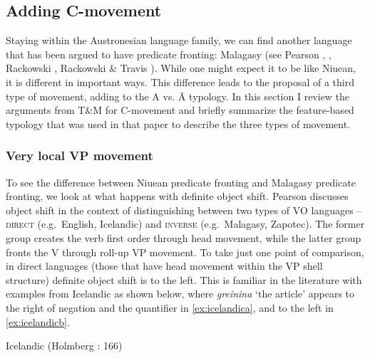 \documentclass[output=paper,colorlinks,citecolor=brown,
]{langscibook}
\begin{document}
\subsection{Adding C-movement}

Staying within the Austronesian language family, we can find another language that has been argued to have predicate fronting: Malagasy (see Pearson \citeyear{Pearson:1997}, \citeyear{Pearson:2018}, Rackowski \citeyear{Rackowski:1998}, Rackowski \& Travis \citeyear{Rackowski:2000}).  While one might expect it to be  like Niuean, it is different in important ways.  This difference leads to the proposal of a third type of movement, adding to the A vs. \=A typology.  In this section I review the arguments from T\&M for C-movement and briefly summarize the feature-based typology that was used in that paper to describe the three types of movement.


\subsubsection{Very local VP movement}

To see the difference between Niuean predicate fronting and Malagasy predicate fronting, we look at what happens with definite object shift.  Pearson \citeyearpar{Pearson:2000} discusses object shift in the context of distinguishing between two types of VO languages -- \textsc{direct} (e.g.\ English, Icelandic) and \textsc{inverse} (e.g.\ Malagasy, Zapotec).  The former group creates the verb first order through head movement, while the latter group fronts the V through roll-up VP movement.  To take just one point of comparison, in direct languages (those that have head movement within the VP shell structure) definite object shift is to the left.  This is familiar in the literature with examples from Icelandic as shown below, where \textit{greinina} `the article' appears to the right of negation and the quantifier in \ref{ex:icelandica}, and to the left in \ref{ex:icelandicb}.  

\ea Icelandic (Holmberg \citeyear{Holmberg:1986}: 166)
    \z
\z
\end{document}
